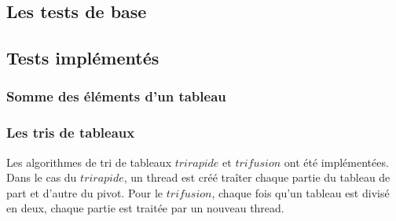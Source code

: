 \subsection{Les tests de base}
\subsection{Tests implémentés}
\subsubsection{Somme des éléments d'un tableau}
\subsubsection{Les tris de tableaux}
Les algorithmes de tri de tableaux $tri rapide$ et $tri fusion$ ont été implémentées. Dans le cas du $tri rapide$, un thread est créé traîter chaque partie du tableau de part et d'autre du pivot. Pour le $tri fusion$, chaque fois qu'un tableau est divisé en deux, chaque partie est traitée par un nouveau thread.\\

